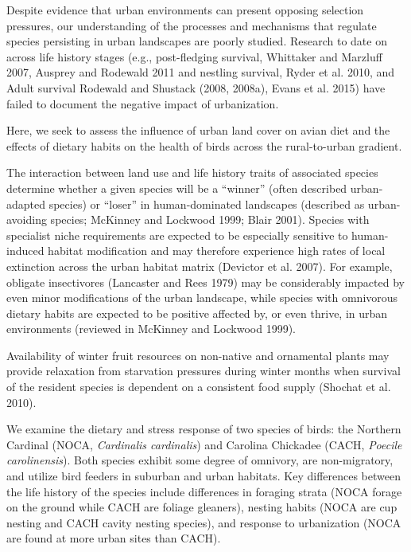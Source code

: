 \documentclass[12pt]{article}
\begin{document}
Despite evidence that urban environments can present opposing selection pressures, our understanding of the processes and mechanisms that regulate species persisting in urban landscapes are poorly studied. Research to date on across life history stages (e.g., post-fledging survival, Whittaker and Marzluff 2007, Ausprey and Rodewald 2011 and nestling survival, Ryder et al. 2010, and Adult survival Rodewald and Shustack (2008, 2008a), Evans et al. 2015) have failed to document the negative impact of urbanization. 


\par
Here, we seek to assess the influence of urban land cover on avian diet and the effects of dietary habits on the health of birds across the rural-to-urban gradient.

The interaction between land use and life history traits of associated species determine whether a given species will be a “winner” (often described urban-adapted species) or “loser” in human-dominated landscapes (described as urban-avoiding species; McKinney and Lockwood 1999; Blair 2001).  Species with specialist niche requirements are expected to be especially sensitive to human-induced habitat modification and may therefore experience high rates of local extinction across the urban habitat matrix (Devictor et al. 2007). For example, obligate insectivores (Lancaster and Rees 1979) may be considerably impacted by even minor modifications of the urban landscape, while species with omnivorous dietary habits are expected to be positive affected by, or even thrive, in urban environments (reviewed in McKinney and Lockwood 1999). 

Availability of winter fruit resources on non-native and ornamental plants may provide relaxation from starvation pressures during winter months when survival of the resident species is dependent on a consistent food supply (Shochat et al. 2010).


\par
We examine the dietary and stress response of two species of birds: the Northern Cardinal (NOCA, \textit{Cardinalis cardinalis}) and Carolina Chickadee (CACH, \textit{Poecile carolinensis}). Both species exhibit some degree of omnivory, are non-migratory, and utilize bird feeders in suburban and urban habitats. Key differences between the life history of the species include differences in foraging strata (NOCA forage on the ground while CACH are foliage gleaners), nesting habits (NOCA are cup nesting and CACH cavity nesting species), and response to urbanization (NOCA are found at more urban sites than CACH).
\end{document}
